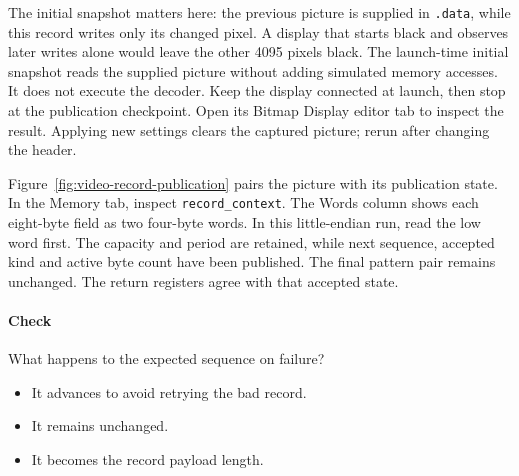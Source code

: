 The initial snapshot matters here: the previous picture is supplied in
\texttt{.data}, while this record writes only its changed pixel. A display
that starts black and observes later writes alone would leave the other 4095
pixels black. The launch-time initial snapshot reads the supplied picture
without adding simulated memory accesses. It does not execute the decoder.
Keep the display connected at launch, then stop at the publication checkpoint.
Open its Bitmap Display editor tab to inspect the result. Applying new settings
clears the captured picture; rerun after changing the header.

Figure~\ref{fig:video-record-publication} pairs the picture with its publication
state. In the Memory tab, inspect \texttt{record\_context}. The Words column
shows each eight-byte field as two four-byte words. In this little-endian run,
read the low word first. The capacity and period are retained, while next sequence,
accepted kind and active byte count have been published. The final pattern pair
remains unchanged. The return registers agree with that accepted state.


\clearpage

\paragraph{Check} What happens to the expected sequence on failure?
\begin{itemize}
  \item[A.] It advances to avoid retrying the bad record.
  \item[B.] It remains unchanged.
  \item[C.] It becomes the record payload length.
\end{itemize}
